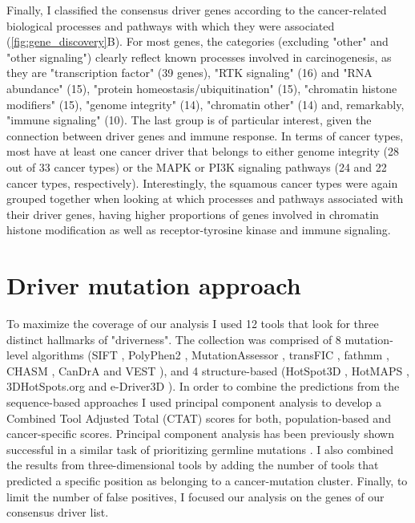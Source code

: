 Finally, I classified the consensus driver genes according to the cancer-related biological processes and pathways with which they were associated (\autoref{fig:gene_discovery}B). For most genes, the categories (excluding "other" and "other signaling") clearly reflect known processes involved in carcinogenesis, as they are "transcription factor" (39 genes), "RTK signaling" (16) and "RNA abundance" (15), "protein homeostasis/ubiquitination" (15), "chromatin histone modifiers" (15), "genome integrity" (14), "chromatin other" (14) and, remarkably, "immune signaling" (10). The last group is of particular interest, given the connection between driver genes and immune response. In terms of cancer types, most have at least one cancer driver that belongs to either genome integrity (28 out of 33 cancer types) or the MAPK or PI3K signaling pathways (24 and 22 cancer types, respectively). Interestingly, the squamous cancer types were again grouped together when looking at which processes and pathways associated with their driver genes, having higher proportions of genes involved in chromatin histone modification as well as receptor-tyrosine kinase and immune signaling. 

\section{Driver mutation approach}

To maximize the coverage of our analysis I used 12 tools that look for three distinct hallmarks of "driverness".  The collection was comprised of 8 mutation-level algorithms (SIFT \cite{RN9}, PolyPhen2 \cite{RN10}, MutationAssessor \cite{RN38}, transFIC \cite{RN53}, fathmm \cite{RN39}, CHASM \cite{RN29}, CanDrA \cite{RN36} and VEST \cite{RN30}), and 4 structure-based (HotSpot3D \cite{RN132}, HotMAPS \cite{RN60}, 3DHotSpots.org \cite{RN133} and e-Driver3D \cite{RN45}). In order to combine the predictions from the sequence-based approaches I used principal component analysis to develop a Combined Tool Adjusted Total (CTAT) scores for both, population-based and cancer-specific scores. Principal component analysis has been previously shown successful in a similar task of prioritizing germline mutations \cite{RN179}. I also combined the results from three-dimensional tools by adding the number of tools that predicted a specific position as belonging to a cancer-mutation cluster. Finally, to limit the number of false positives, I focused our analysis on the genes of our consensus driver list.

